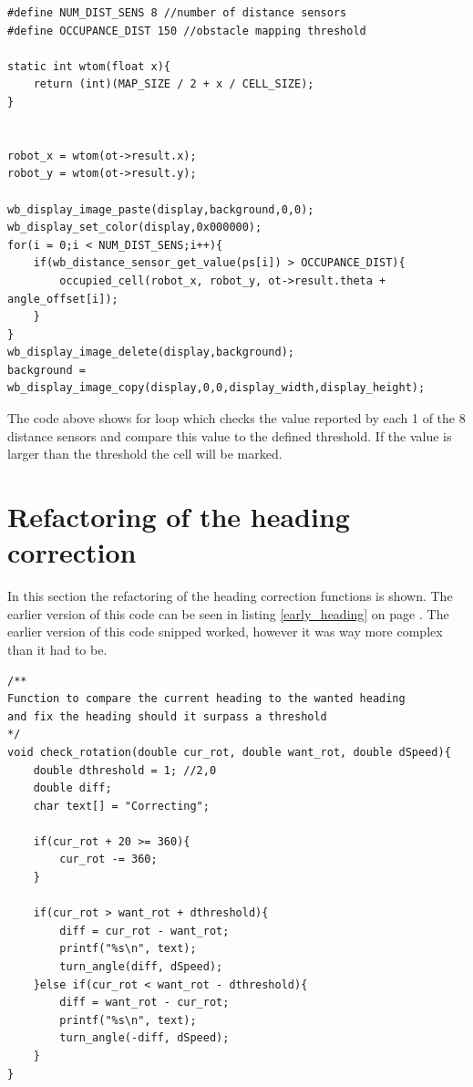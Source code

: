 \begin{lstlisting}[caption={obstacle detection and mapping}]
#define NUM_DIST_SENS 8 //number of distance sensors
#define OCCUPANCE_DIST 150 //obstacle mapping threshold

static int wtom(float x){
    return (int)(MAP_SIZE / 2 + x / CELL_SIZE);
}


robot_x = wtom(ot->result.x);
robot_y = wtom(ot->result.y);

wb_display_image_paste(display,background,0,0);
wb_display_set_color(display,0x000000);
for(i = 0;i < NUM_DIST_SENS;i++){
    if(wb_distance_sensor_get_value(ps[i]) > OCCUPANCE_DIST){
        occupied_cell(robot_x, robot_y, ot->result.theta + angle_offset[i]);
    }
}
wb_display_image_delete(display,background);
background = wb_display_image_copy(display,0,0,display_width,display_height);
\end{lstlisting}

The code above shows for loop which checks the value reported by each 1 of the 8 distance sensors and compare this value to the defined threshold. If the value is larger than the threshold the cell will be marked.

\section{Refactoring of the heading correction}
In this section the refactoring of the heading correction functions is shown.
The earlier version of this code can be seen in listing \ref{early_heading} on page \pageref{early_heading}.
The earlier version of this code snipped worked, however it was way more complex than it had to be.

\begin{lstlisting}[caption={Refactored heading control code} ]
/**
Function to compare the current heading to the wanted heading
and fix the heading should it surpass a threshold
*/
void check_rotation(double cur_rot, double want_rot, double dSpeed){
    double dthreshold = 1; //2,0
    double diff;
    char text[] = "Correcting";
    
    if(cur_rot + 20 >= 360){
        cur_rot -= 360;
    }
    
    if(cur_rot > want_rot + dthreshold){
        diff = cur_rot - want_rot;
        printf("%s\n", text);
        turn_angle(diff, dSpeed);
    }else if(cur_rot < want_rot - dthreshold){
        diff = want_rot - cur_rot;
        printf("%s\n", text);
        turn_angle(-diff, dSpeed);
    }
}
\end{lstlisting}

